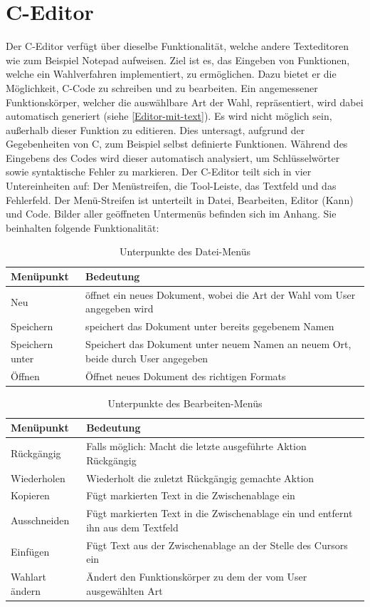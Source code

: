 \documentclass[a4paper]{scrreprt}
\begin{document}
\section{C-Editor}
Der C-Editor verfügt über dieselbe Funktionalität, welche andere Texteditoren wie zum Beispiel Notepad aufweisen. Ziel ist es, das Eingeben von Funktionen, welche ein Wahlverfahren implementiert, zu ermöglichen. Dazu bietet er die Möglichkeit, C-Code zu schreiben und zu bearbeiten. Ein angemessener Funktionskörper, welcher die auswählbare Art der Wahl, repräsentiert, wird dabei automatisch generiert (siehe \ref{Editor-mit-text}). Es wird nicht möglich sein, außerhalb dieser Funktion zu editieren. Dies untersagt, aufgrund der Gegebenheiten von C, zum Beispiel selbst definierte Funktionen. Während des Eingebens des Codes wird dieser automatisch analysiert, um Schlüsselwörter sowie syntaktische Fehler zu markieren. 
Der C-Editor teilt sich in vier Untereinheiten auf: Der Menüstreifen, die Tool-Leiste, das Textfeld und das Fehlerfeld. Der Menü-Streifen ist unterteilt in Datei, Bearbeiten, Editor (Kann) und Code. Bilder aller geöffneten Untermenüs befinden sich im Anhang. Sie beinhalten folgende Funktionalität:

\begin{table}[H]
\begin{tabular}{|p{3cm}|p{12cm}|}
Menüpunkt & Bedeutung \\
\hline
Neu & öffnet ein neues Dokument, wobei die Art der Wahl vom User angegeben wird \\
Speichern & speichert das Dokument unter bereits gegebenem Namen \\
Speichern unter & Speichert das Dokument unter neuem Namen an neuem Ort, beide durch User angegeben \\
Öffnen & Öffnet neues Dokument des richtigen Formats
\end{tabular}
\label{Datei-Menüpunkte}
\caption{Unterpunkte des Datei-Menüs}
\end{table}

\begin{table}[H]
\begin{tabular}{|p{3cm}|p{12cm}|}
Menüpunkt & Bedeutung \\
\hline
Rückgängig & Falls möglich: Macht die letzte ausgeführte Aktion Rückgängig \\
Wiederholen & Wiederholt die zuletzt Rückgängig gemachte Aktion \\
Kopieren & Fügt markierten Text in die Zwischenablage ein \\
Ausschneiden & Fügt markierten Text in die Zwischenablage ein und entfernt ihn aus dem Textfeld \\
Einfügen & Fügt Text aus der Zwischenablage an der Stelle des Cursors ein \\
Wahlart ändern & Ändert den Funktionskörper zu dem der vom User ausgewählten Art
\end{tabular}
\label{Bearbeiten-Menüpunkte}
\caption{Unterpunkte des Bearbeiten-Menüs}
\end{table}
\end{document}
